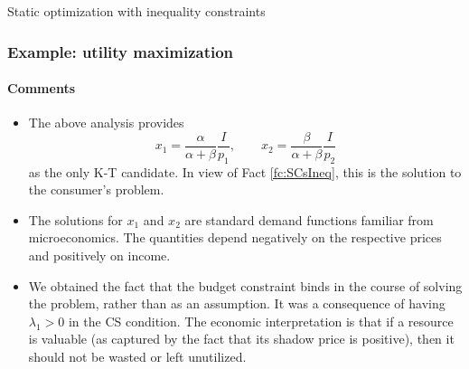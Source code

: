 \documentclass[10pt]{beamer}
\theoremstyle{definition}
\begin{document}
\begin{section}{Static optimization with inequality constraints}
\begin{frame}[fragile]
\frametitle{Example: utility maximization}
\framesubtitle{Comments}
\begin{itemize}
\item The above analysis provides \[ x_1 = \dfrac{\alpha}{\alpha+\beta}\dfrac{I}{p_1}, \qquad x_2 = \dfrac{\beta}{\alpha+\beta}\dfrac{I}{p_2} \] as the only K-T candidate. In view of Fact \ref{fc:SCsIneq}, this is the solution to the consumer's problem.
\item The solutions for $ x_1 $ and $ x_2 $ are standard demand functions familiar from microeconomics. The quantities depend negatively on the respective prices and positively on income.
\item We obtained the fact that the budget constraint binds in the course of solving the problem, rather than as an assumption. It was a consequence of having $ \lambda_1 > 0$ in the CS condition. The economic interpretation is that if a resource is valuable (as captured by the fact that its shadow price is positive), then it should not be wasted or left unutilized.
\end{itemize}
\end{frame}

%
%

\end{section}
\end{document}
